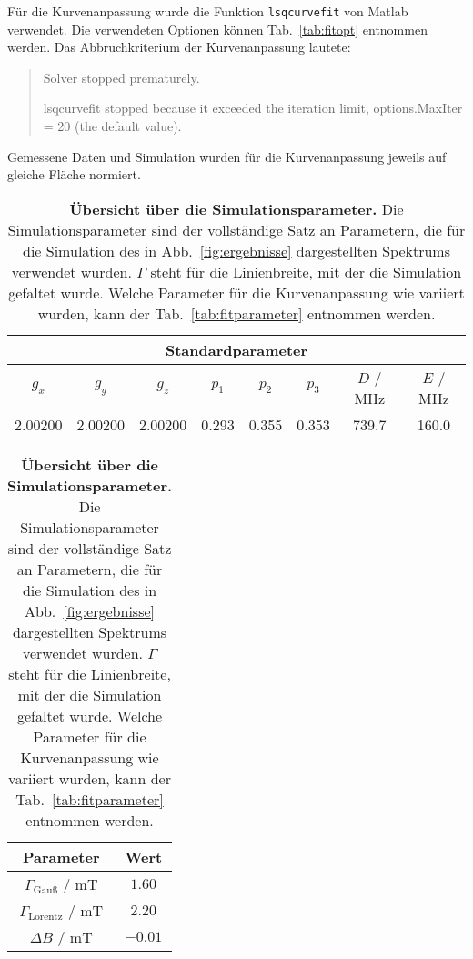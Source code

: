 \documentclass{article}
\newcommand{\matlab}{\textsf{Matlab}}
\begin{document}
\clearpage


Für die Kurvenanpassung wurde die Funktion \texttt{lsqcurvefit} von \matlab{} verwendet. Die verwendeten Optionen können Tab.~\ref{tab:fitopt} entnommen werden. Das Abbruchkriterium der Kurvenanpassung lautete:

\begin{quote}\small
\ttfamily
Solver stopped prematurely.

lsqcurvefit stopped because it exceeded the iteration limit,
options.MaxIter = 20 (the default value).
\end{quote}

Gemessene Daten und Simulation wurden für die Kurvenanpassung jeweils auf gleiche Fläche normiert.

\begin{table}[h]
\caption{\textbf{Übersicht über die Simulationsparameter.} Die Simulationsparameter sind der vollständige Satz an Parametern, die für die Simulation des in Abb.~\ref{fig:ergebnisse} dargestellten Spektrums verwendet wurden. $\Gamma$ steht für die Linienbreite, mit der die Simulation gefaltet wurde. Welche Parameter für die Kurvenanpassung wie variiert wurden, kann der Tab.~\ref{tab:fitparameter} entnommen werden.}
\label{tab:simparameter}
\centering
\begin{tabular}{cccccccc} 
\toprule
\multicolumn{8}{c}{\textbf{Standardparameter} }
\\
\midrule 
$g_x$      & $g_y$      & $g_z$      & $p_1$   & $p_2$   & $p_3$   & $D$ / MHz & $E$ / MHz \\
2.00200 & 2.00200 & 2.00200 & 0.293 & 0.355 & 0.353 &   739.7  &   160.0     \\ 
\bottomrule
\end{tabular}

\begin{tabular}{cc}
\toprule
\textbf{Parameter} & \textbf{Wert}
\\
\midrule

$\Gamma_\text{Gauß}$ / mT & $1.60$
\\

$\Gamma_\text{Lorentz}$ / mT & $2.20$
\\

$\Delta B$ / mT & $-0.01$
\\

\bottomrule
\end{tabular}
\end{table}
\end{document}
